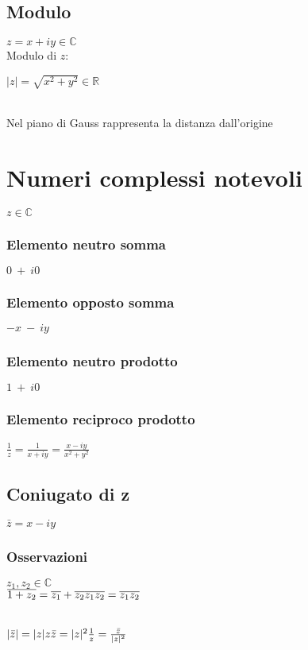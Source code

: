 \subsection{Modulo}
$z = x+iy \in \mathbb{C}$\\
Modulo di $z$:\\
\begin{Large}
$|z| = \sqrt{x^2+y^2} \in \mathbb{R}$
\end{Large}\\
Nel piano di Gauss rappresenta la distanza dall'origine

\section{Numeri complessi notevoli}
$z \in \mathbb{C}$
\subsubsection{Elemento neutro somma}
$0\ +\ i0$
\subsubsection{Elemento opposto somma}
$-x\ -\ iy$
\subsubsection{Elemento neutro prodotto}
$1\ +\ i0$
\subsubsection{Elemento reciproco prodotto}
\begin{Large}
$\frac{1}{z}=\frac{1}{x+iy}=\frac{x-iy}{x^2+y^2}$
\end{Large}

\subsection{Coniugato di z}
$\bar{z} = x-iy$
\subsubsection{Osservazioni}
$z_1,z_2 \in \mathbb{C}$\\
$\overline{1+z_2} = \overline{z_1}+\overline{z_2}\\
\overline{z_1z_2} = \overline{z_1}\overline{z_2}$\\
\\
\begin{Large}
$|\bar{z}| = |z|\\
z\bar{z}=|z|^2\\
\frac{1}{z} = \frac{\bar{z}}{|z|^2}$
\end{Large}
